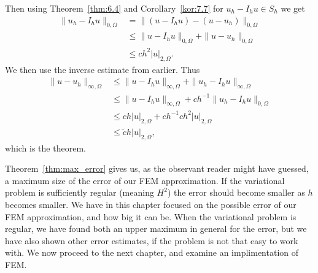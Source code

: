 \begin{bev}
    Then using Theorem~\ref{thm:6.4} and Corollary~\ref{kor:7.7}
    for $u_h-I_h u\in S_h$
    we get
    \begin{align*}
        \|u_h-I_h u\|_{0,\Omega} &= \| (u-I_h u)-(u-u_h)\|_{0,\Omega} \\
        & \leq \| u-I_h u\|_{0,\Omega}+\|u-u_h\|_{0,\Omega} \\
        &\leq ch^2|u|_{2,\Omega}.
    \end{align*}
    We then use the inverse estimate from earlier. Thus 
    \begin{align}
        \|u-u_h\|_{\infty,\Omega} &\leq \|u-I_h u\|_{\infty,\Omega} + \|u_h-I_h u\|_{\infty,\Omega} \\
        &\leq \|u-I_h u\|_{\infty,\Omega} + ch^{-1} \|u_h-I_h u\|_{0,\Omega} \\
        &\leq ch|u|_{2,\Omega} + ch^{-1} ch^2|u|_{2,\Omega}\\ 
        &\leq \tilde{c}h|u|_{2,\Omega},
    \end{align}
    which is the theorem.    
\end{bev}
Theorem~\ref{thm:max_error} gives us, as the observant reader might have guessed, 
a maximum size of the error of our FEM approximation.
If the variational problem is sufficiently regular (meaning $H^2$)
the error should
become smaller as $h$ becomes smaller. 
We have in this chapter focused on the possible error of our FEM approximation, 
and how big it can be. 
When the variational problem is regular, we have found both an upper maximum 
in general for the error, but we have also shown other error estimates, 
if the problem is not that easy to work with.
We now proceed to the next chapter, and examine an implimentation of 
FEM.